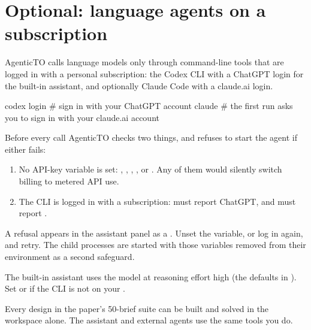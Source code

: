 \section{Optional: language agents on a subscription}\label{sec:agents}
AgenticTO calls language models only through command-line tools that are logged in with a personal subscription:
the Codex CLI with a ChatGPT login for the built-in assistant, and optionally Claude Code with a claude.ai login.

\begin{shell}
codex login        # sign in with your ChatGPT account
claude             # the first run asks you to sign in with your claude.ai account
\end{shell}

Before every call AgenticTO checks two things, and refuses to start the agent if either fails:
\begin{enumerate}\sloppy
  \item No API-key variable is set: , , ,
  ,  or . Any of them would
  silently switch billing to metered API use.
  \item The CLI is logged in with a subscription:  must report ChatGPT, and
   must report .
\end{enumerate}
A refusal appears in the assistant panel as a . Unset the variable, or log in again, and retry. The
child processes are started with those variables removed from their environment as a second safeguard.

The built-in assistant uses the model  at reasoning effort high (the defaults in
). Set  or  if the CLI is not on your
.

\begin{tipbox}
Every design in the paper's 50-brief suite can be built and solved in the workspace alone. The assistant and external
agents use the same tools you do.
\end{tipbox}
